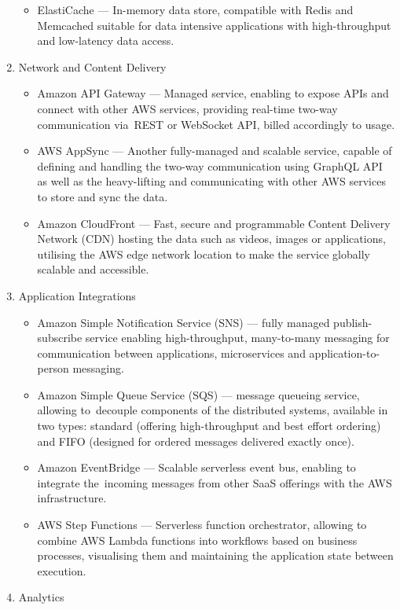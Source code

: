\begin{enumerate}
\begin{itemize}
       \item ElastiCache --- In-memory data store, compatible with Redis and Memcached suitable for data intensive applications with high-throughput and low-latency data access.
   \end{itemize}
   \item Network and Content Delivery
   \begin{itemize}
       \item Amazon API Gateway --- Managed service, enabling to expose APIs and connect with other AWS services, providing real-time two-way communication via~REST or WebSocket API, billed accordingly to usage.
       \item AWS AppSync --- Another fully-managed and scalable service, capable of defining and handling the two-way communication using GraphQL API as well as the heavy-lifting and communicating with other AWS services to store and sync the data.
       \item Amazon CloudFront --- Fast, secure and programmable Content Delivery Network (CDN) hosting the data such as videos, images or applications, utilising the AWS edge network location to make the service globally scalable and accessible.
   \end{itemize}
   \item Application Integrations
   \begin{itemize}
       \item Amazon Simple Notification Service (SNS) --- fully managed publish-subscribe service enabling high-throughput, many-to-many messaging for communication between applications, microservices and application-to-person messaging.
       \item Amazon Simple Queue Service (SQS) --- message queueing service, allowing to~decouple components of the distributed systems, available in two types: standard (offering high-throughput and best effort ordering) and FIFO (designed for ordered messages delivered exactly once).
       \item Amazon EventBridge --- Scalable serverless event bus, enabling to integrate the~incoming messages from other SaaS offerings with the AWS infrastructure.
       \item AWS Step Functions --- Serverless function orchestrator, allowing to combine AWS Lambda functions into workflows based on business processes, visualising them and maintaining the application state between execution.
   \end{itemize}
   \item Analytics

\end{enumerate}
